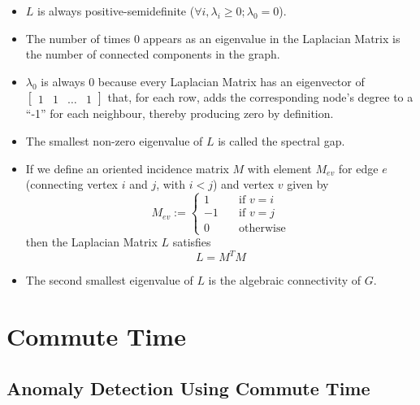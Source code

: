 \begin{itemize}
\item $L$ is always positive-semidefinite ($\forall i, \lambda_{i} \geq 0; 
\lambda_{0} = 0$).
\item The number of times $0$ appears as an eigenvalue in the Laplacian Matrix 
is the number of connected components in the graph.
\item $\lambda_{0}$ is always $0$ because every Laplacian Matrix has an 
eigenvector of $\begin{bmatrix} 1 & 1 & \ldots & 1 \end{bmatrix}$ that, for each
row, adds the corresponding node's degree to a ``-1'' for each neighbour, 
thereby producing zero by definition.
\item The smallest non-zero eigenvalue of $L$ is called the spectral gap.
\item If we define an oriented incidence matrix $M$ with element $M_{ev}$ for 
edge $e$ (connecting vertex $i$ and $j$, with $i < j$) and vertex $v$ given by
\begin{displaymath}
M_{ev} := 
    \left\{
        \begin{array}{ll}
            1 &     \quad \text{if $v = i$} \\
            -1 &    \quad \text{if $v = j$} \\
            0 &     \quad \text{otherwise}
        \end{array}
    \right.
\end{displaymath}
then the Laplacian Matrix $L$ satisfies
\begin{displaymath}
L = M^{T}M
\end{displaymath}
\item The second smallest eigenvalue of $L$ is the algebraic connectivity of 
$G$.
\end{itemize}

\section{Commute Time}
\subsection{Anomaly Detection Using Commute Time}
